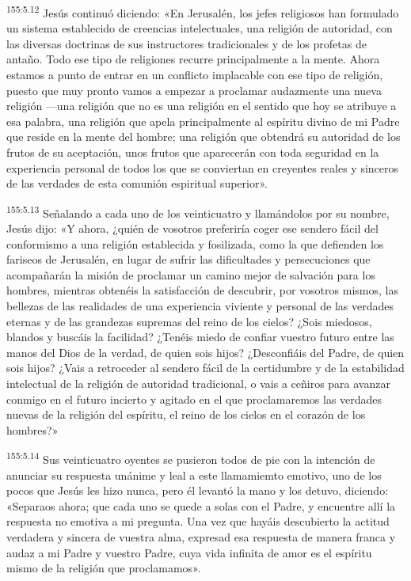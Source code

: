 \par 
\textsuperscript{155:5.12} Jesús continuó diciendo: «En Jerusalén, los jefes religiosos han formulado un sistema establecido de creencias intelectuales, una religión de autoridad, con las diversas doctrinas de sus instructores tradicionales y de los profetas de antaño. Todo ese tipo de religiones recurre principalmente a la mente. Ahora estamos a punto de entrar en un conflicto implacable con ese tipo de religión, puesto que muy pronto vamos a empezar a proclamar audazmente una nueva religión ---una religión que no es una religión en el sentido que hoy se atribuye a esa palabra, una religión que apela principalmente al espíritu divino de mi Padre que reside en la mente del hombre; una religión que obtendrá su autoridad de los frutos de su aceptación, unos frutos que aparecerán con toda seguridad en la experiencia personal de todos los que se conviertan en creyentes reales y sinceros de las verdades de esta comunión espiritual superior».

\par 
\textsuperscript{155:5.13} Señalando a cada uno de los veinticuatro y llamándolos por su nombre, Jesús dijo: «Y ahora, ¿quién de vosotros preferiría coger ese sendero fácil del conformismo a una religión establecida y fosilizada, como la que defienden los fariseos de Jerusalén, en lugar de sufrir las dificultades y persecuciones que acompañarán la misión de proclamar un camino mejor de salvación para los hombres, mientras obtenéis la satisfacción de descubrir, por vosotros mismos, las bellezas de las realidades de una experiencia viviente y personal de las verdades eternas y de las grandezas supremas del reino de los cielos? ¿Sois miedosos, blandos y buscáis la facilidad? ¿Tenéis miedo de confiar vuestro futuro entre las manos del Dios de la verdad, de quien sois hijos? ¿Desconfiáis del Padre, de quien sois hijos? ¿Vais a retroceder al sendero fácil de la certidumbre y de la estabilidad intelectual de la religión de autoridad tradicional, o vais a ceñiros para avanzar conmigo en el futuro incierto y agitado en el que proclamaremos las verdades nuevas de la religión del espíritu, el reino de los cielos en el corazón de los hombres?»

\par 
\textsuperscript{155:5.14} Sus veinticuatro oyentes se pusieron todos de pie con la intención de anunciar su respuesta unánime y leal a este llamamiemto emotivo, uno de los pocos que Jesús les hizo nunca, pero él levantó la mano y los detuvo, diciendo: «Separaos ahora; que cada uno se quede a solas con el Padre, y encuentre allí la respuesta no emotiva a mi pregunta. Una vez que hayáis descubierto la actitud verdadera y sincera de vuestra alma, expresad esa respuesta de manera franca y audaz a mi Padre y vuestro Padre, cuya vida infinita de amor es el espíritu mismo de la religión que proclamamos».

